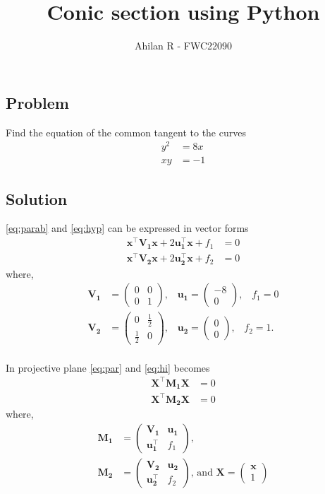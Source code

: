 \documentclass[journal,12pt,twocolumn]{IEEEtran}
\title{Conic section using Python}
\author{Ahilan R - FWC22090}
\let\vec\mathbf
\newcommand{\myvec}[1]{\ensuremath{\begin{pmatrix}#1\end{pmatrix}}}
\begin{document}
\maketitle

\subsection*{\textbf{Problem}}
Find the equation of the common tangent to the curves 
\begin{align}
		y^2&=8x \label{eq:parab} \\
		xy&=-1 \label{eq:hyp}
\end{align}
\subsection*{\textbf{Solution}}
\eqref{eq:parab} and \eqref{eq:hyp} can be expressed in vector forms
\begin{align}
		\vec{x^{\top}}\vec{V_1}\vec{x} + 2\vec{u_1^{\top}}\vec{x} + f_1 &= 0  \label{eq:par} \\
		\vec{x^{\top}}\vec{V_2}\vec{x}  + 2\vec{u_2^{\top}}\vec{x} + f_2 &= 0 \label{eq:hi} 
\end{align}
where,
\begin{align*}
		\vec{V_1} &= \myvec{0&0\\0&1} \text{,}\quad  
		\vec{u_1} = \myvec{-8\\0}  \text{,} \quad  f_1 = 0\\
		\vec{V_2} &= \myvec{0&\frac{1}{2}\\\frac{1}{2}&0} \text{,} \quad 
		  \vec{u_2} = \myvec{0\\0} \text{,}  \quad f_2 = 1 \text{.} %
\end{align*}
\\
In projective plane \eqref{eq:par} and \eqref{eq:hi} becomes %
\begin{align}
		\vec{X^{\top}}\vec{M_1}\vec{X} &= 0 \label{eq:ppar} \\
		\vec{X^{\top}}\vec{M_2}\vec{X} &= 0 \label{eq:phi} 
\end{align}
where,
\begin{align*}
		\vec{M_1} &= \myvec{\vec{V_1}&\vec{u_1}\\\vec{u_1^{\top}}&f_1} \text{, } \\[0.5ex]
		\vec{M_2} &= \myvec{\vec{V_2}&\vec{u_2}\\\vec{u_2^{\top}}&f_2} \text{,} \text{ and } 
		\vec{X}=\myvec{\vec{x}\\1} 
\end{align*}
\end{document}
